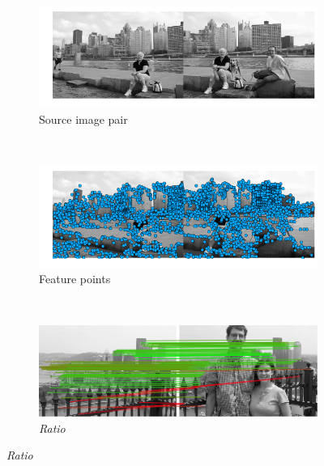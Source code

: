 \begin{figure}[h]
    \centering%
        \begin{subfigure}[t]{0.5\columnwidth}
            \centering
            \includegraphics[width=0.95\columnwidth]{images/MMC_pitts_source}
            \caption{Source image pair}
            \label{fig:pitts_source}
        \end{subfigure}%
        ~ %
        \begin{subfigure}[t]{0.5\columnwidth}
            \centering
            \includegraphics[width=0.95\columnwidth]{images/MMC_pitts_keypoints}
            \caption{Feature points}
            \label{fig:pitts_keypoints}
        \end{subfigure}%
        \\ %
        \begin{subfigure}[t]{0.5\columnwidth}
            \centering
            \includegraphics[width=0.95\columnwidth]{images/mirror_match_off}
            \caption{\emph{Ratio}}
            \label{fig:unique}
        \end{subfigure}%

\end{figure}
